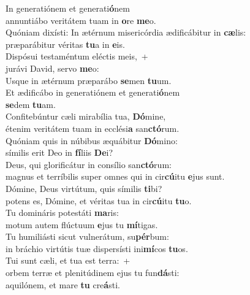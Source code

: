 \evenverse In generatiónem et generati\textbf{ó}nem~\*\\
\evenverse annuntiábo veritátem tuam in \textbf{o}re \textbf{me}o.\\
\oddverse Quóniam dixísti: In ætérnum misericórdia ædificábitur in \textbf{cæ}lis:~\*\\
\oddverse præparábitur véritas \textbf{tu}a in \textbf{e}is.\\
\evenverse Dispósui testaméntum eléctis meis,~+\\
\evenverse  jurávi David, servo \textbf{me}o:~\*\\
\evenverse Usque in ætérnum præparábo \textbf{se}men \textbf{tu}um.\\
\oddverse Et ædificábo in generatiónem et generati\textbf{ó}nem~\*\\
\oddverse \textbf{se}dem \textbf{tu}am.\\
\evenverse Confitebúntur cæli mirabília tua, \textbf{Dó}mine,~\*\\
\evenverse étenim veritátem tuam in ecclési\textbf{a} san\textbf{ctó}rum.\\
\oddverse Quóniam quis in núbibus æquábitur \textbf{Dó}mino:~\*\\
\oddverse símilis erit Deo in \textbf{fí}liis \textbf{De}i?\\
\evenverse Deus, qui glorificátur in consílio san\textbf{ctó}rum:~\*\\
\evenverse magnus et terríbilis super omnes qui in cir\textbf{cú}itu \textbf{e}jus sunt.\\
\oddverse Dómine, Deus virtútum, quis símilis \textbf{ti}bi?~\*\\
\oddverse potens es, Dómine, et véritas tua in cir\textbf{cú}itu \textbf{tu}o.\\
\evenverse Tu domináris potestáti \textbf{ma}ris:~\*\\
\evenverse motum autem flúctuum \textbf{e}jus tu \textbf{mí}tigas.\\
\oddverse Tu humiliásti sicut vulnerátum, su\textbf{pér}bum:~\*\\
\oddverse in bráchio virtútis tuæ dispersísti ini\textbf{mí}cos \textbf{tu}os.\\
\evenverse Tui sunt cæli, et tua est terra:~+\\
\evenverse  orbem terræ et plenitúdinem ejus tu fun\textbf{dá}sti:~\*\\
\evenverse aquilónem, et mare \textbf{tu} cre\textbf{á}sti.\\
